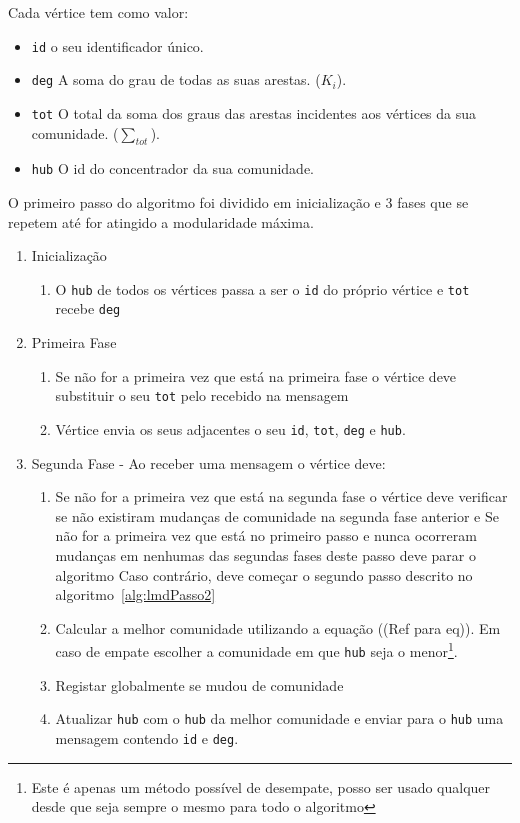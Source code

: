 \documentclass[a4paper,10pt]{report}
\begin{document}
Cada vértice tem como valor:
\begin{itemize}
	\item \verb|id| o seu identificador único.
	\item \verb|deg| A soma do grau de todas as suas arestas. ($K_i$).
	\item \verb|tot| O total da soma dos graus das arestas incidentes aos vértices da sua comunidade. ($\sum_{tot}$).
	\item \verb|hub| O id do concentrador da sua comunidade.
\end{itemize}

O primeiro passo do algoritmo foi dividido em inicialização e 3 fases que se repetem até for atingido a modularidade máxima.

\begin{algorithm}[H]
\begin{minipage}{\textwidth}
\caption{Louvain \textit{Method} Distribuido Passo 1}
\label{alg:lmdPasso1}
\begin{enumerate}
  \item Inicialização
			\begin{enumerate}
				\item O \verb|hub| de todos os vértices passa a ser o \verb|id| do próprio vértice e \verb|tot| 				recebe \verb|deg|
			\end{enumerate}
	\item Primeira Fase
	\begin{enumerate}
	\item Se não for a primeira vez que está na primeira fase o vértice deve substituir o seu \verb|tot| pelo recebido na mensagem
	\item Vértice envia os seus adjacentes o seu \verb|id|, \verb|tot|, \verb|deg| e \verb|hub|.
	\end{enumerate}
	
  \item Segunda Fase -  Ao receber uma mensagem o vértice deve:
  
		\begin{enumerate}
				\item Se não for a primeira vez que está na segunda fase o vértice deve verificar se não existiram mudanças de comunidade na segunda fase anterior e
						\subitem Se não for a primeira vez que está no primeiro passo e nunca ocorreram mudanças em nenhumas das segundas fases deste passo deve parar o algoritmo
						\subitem Caso contrário, deve começar o segundo passo descrito no algoritmo~\ref{alg:lmdPasso2}
				\item Calcular a melhor comunidade utilizando a equação ((Ref para eq)). 
				Em caso de empate	escolher a comunidade em que \verb|hub| seja o menor\footnote{Este é apenas um método possível de desempate, posso ser usado qualquer desde que seja sempre o mesmo para todo o algoritmo}.
				\item Registar globalmente se mudou de comunidade
				\item Atualizar \verb|hub| com o \verb|hub| da melhor comunidade e enviar para o \verb|hub| uma mensagem contendo \verb|id| e \verb|deg|.
		\end{enumerate}
		

\end{enumerate}
\end{minipage}
\end{algorithm}
\end{document}
